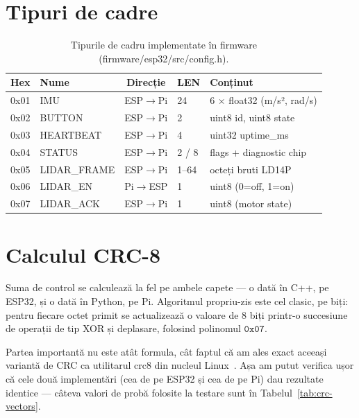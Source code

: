 \documentclass[a4paper,12pt,twoside,openany]{report}
\renewcommand{\texttt}[1]{\textnormal{#1}}
\begin{document}
\section{Tipuri de cadre}
\label{sec:frame-types}

\begin{table}[H]
\centering
\caption{Tipurile de cadru implementate în firmware (\texttt{firmware/esp32/src/config.h}).}
\label{tab:frame-types}
\renewcommand{\arraystretch}{1.15}
\begin{tabular}{llcll}
\toprule
\textbf{Hex} & \textbf{Nume} & \textbf{Direcție} & \textbf{LEN} & \textbf{Conținut} \\
\midrule
0x01 & IMU         & ESP$\to$Pi & 24    & 6 $\times$ float32 (m/s², rad/s) \\
0x02 & BUTTON      & ESP$\to$Pi & 2     & uint8 id, uint8 state \\
0x03 & HEARTBEAT   & ESP$\to$Pi & 4     & uint32 uptime\_ms \\
0x04 & STATUS      & ESP$\to$Pi & 2 / 8 & flags + diagnostic chip \\
0x05 & LIDAR\_FRAME & ESP$\to$Pi & 1--64 & octeți bruti LD14P \\
0x06 & LIDAR\_EN   & Pi$\to$ESP & 1     & uint8 (0=off, 1=on) \\
0x07 & LIDAR\_ACK  & ESP$\to$Pi & 1     & uint8 (motor state) \\
\bottomrule
\end{tabular}
\end{table}

\section{Calculul CRC-8}
\label{sec:crc-calc}

Suma de control se calculează la fel pe ambele capete — o dată în C++, pe
ESP32, și o dată în Python, pe Pi. Algoritmul propriu-zis este cel clasic, pe
biți: pentru fiecare octet primit se actualizează o valoare de 8 biți printr-o
succesiune de operații de tip XOR și deplasare, folosind polinomul
$\mathtt{0x07}$.

Partea importantă nu este atât formula, cât faptul că am ales exact aceeași
variantă de CRC ca utilitarul \texttt{crc8} din nucleul Linux~\cite{linuxcrc8,
maxim1wirecrc}. Așa am putut verifica ușor că cele două implementări (cea de pe
ESP32 și cea de pe Pi) dau rezultate identice — câteva valori de probă folosite
la testare sunt în Tabelul~\ref{tab:crc-vectors}.
\end{document}
